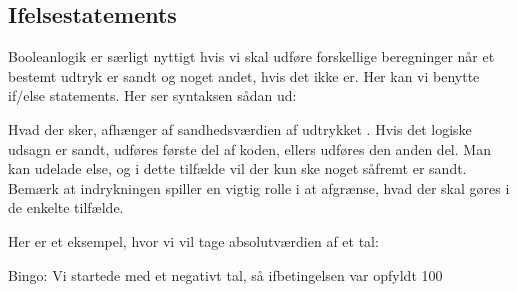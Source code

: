 \documentclass[letterpaper,10pt,english]{jupyterBook}
\begin{document}
\subsection{If\sphinxhyphen{}else\sphinxhyphen{}statements}
\label{\detokenize{notebooks/Andet_python:if-else-statements}}
Boolean\sphinxhyphen{}logik er særligt nyttigt hvis vi skal udføre forskellige beregninger når et bestemt udtryk er sandt og noget andet, hvis det ikke er. Her kan vi benytte if/else statements. Her ser syntaksen sådan ud:

\begin{sphinxVerbatim}[commandchars=\\\{\}]
 
        
        
\end{sphinxVerbatim}

Hvad der sker, afhænger af sandhedsværdien af udtrykket . Hvis det logiske udsagn  er sandt, udføres første del af koden, ellers udføres den anden del. Man kan udelade else, og i dette tilfælde vil der kun ske noget såfremt  er sandt.
Bemærk at indrykningen spiller en vigtig rolle i at afgrænse, hvad der skal gøres i de enkelte tilfælde.

Her er et eksempel, hvor vi vil tage absolutværdien af et tal:

\begin{sphinxVerbatim}[commandchars=\\\{\}]
  
    
          
\end{sphinxVerbatim}

\begin{sphinxVerbatim}[commandchars=\\\{\}]
Bingo: Vi startede med et negativt tal, så if\PYGZhy{}betingelsen var opfyldt
100
\end{sphinxVerbatim}
\end{document}
